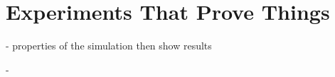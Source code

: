 
\def\chapdir{./ChapterExperiments}

\chapter{Experiments That Prove Things}\label{ch:experiments}
- properties of the simulation then show results











- 


